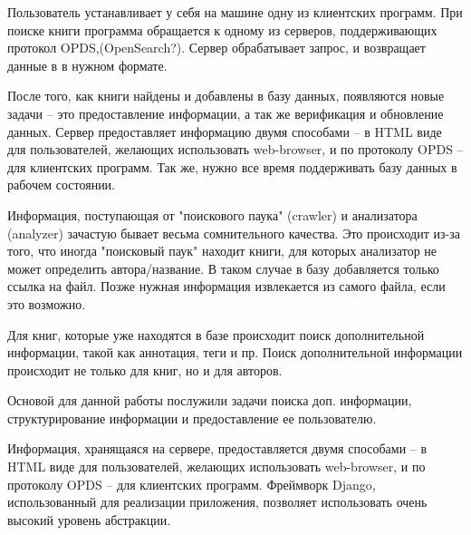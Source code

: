\documentclass[a4paper]{report}
\begin{document}


Пользователь устанавливает у себя на машине одну из клиентских программ. При поиске книги программа обращается к одному из серверов, поддерживающих протокол OPDS,(OpenSearch?). Сервер обрабатывает запрос, и возвращает данные в в нужном формате. 


После того, как книги найдены и добавлены в базу данных, появляются новые задачи -- это предоставление информации, а так же верификация и обновление данных. Сервер предоставляет информацию двумя способами -- в HTML виде для пользователей, желающих использовать web-browser, и по протоколу OPDS -- для клиентских программ. Так же, нужно все время поддерживать базу данных в рабочем состоянии. 

Информация, поступающая от "поискового паука" (crawler) и анализатора (analyzer) зачастую бывает весьма сомнительного качества. Это происходит из-за того, что иногда "поисковый паук" находит книги, для которых анализатор не может определить автора/название. В таком случае в базу добавляется только ссылка на файл. 
Позже нужная информация извлекается из самого файла, если это возможно.

Для книг, которые уже находятся в базе происходит поиск дополнительной информации, такой как аннотация, теги и пр. Поиск дополнительной информации происходит не только для книг, но и для авторов.

Основой для данной работы послужили задачи поиска доп. информации, структурирование информации и предоставление ее пользователю.



Информация, хранящаяся на сервере, предоставляется двумя способами -- в HTML виде для пользователей, желающих использовать web-browser, и по протоколу OPDS -- для клиентских программ. Фреймворк Django, использованный для реализации приложения, позволяет использовать очень высокий уровень абстракции.
\end{document}
